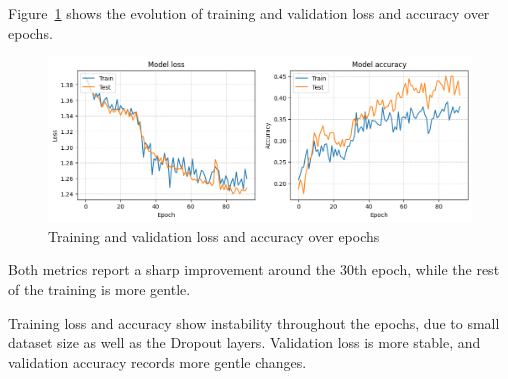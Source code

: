 Figure~\ref{fig:loss_acc} shows the evolution of training and validation loss
and accuracy over epochs.
\begin{figure}[H]
    \centering
    \includegraphics[width=1\textwidth]{plotsss/ts_loss_acc.png}
    \caption{Training and validation loss and accuracy over epochs}
    \label{fig:loss_acc}
\end{figure}

Both metrics report a sharp improvement around the 30th epoch,
while the rest of the training is more gentle.

Training loss and accuracy show instability throughout the epochs,
due to small dataset size as well as the Dropout layers.
Validation loss is more stable, and validation accuracy records more
gentle changes.



